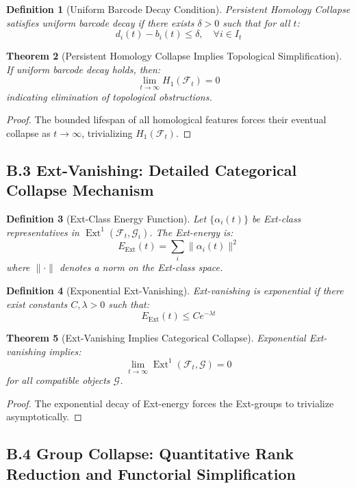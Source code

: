\documentclass[11pt]{article}
\newtheorem{theorem}{Theorem}[section]
\newtheorem{definition}[theorem]{Definition}
\DeclareMathOperator{\Ext}{Ext}
\begin{document}
\begin{definition}[Uniform Barcode Decay Condition]
Persistent Homology Collapse satisfies uniform barcode decay if there exists $\delta > 0$ such that for all $t$:
\[
d_i(t) - b_i(t) \leq \delta, \quad \forall i \in I_t
\]
\end{definition}

\begin{theorem}[Persistent Homology Collapse Implies Topological Simplification]
If uniform barcode decay holds, then:
\[
\lim_{t \to \infty} H_1(\mathcal{F}_t) = 0
\]
indicating elimination of topological obstructions.
\end{theorem}

\begin{proof}
The bounded lifespan of all homological features forces their eventual collapse as $t \to \infty$, trivializing $H_1(\mathcal{F}_t)$.
\end{proof}

\subsection*{B.3 Ext-Vanishing: Detailed Categorical Collapse Mechanism}

\begin{definition}[Ext-Class Energy Function]
Let $\{\alpha_i(t)\}$ be Ext-class representatives in $\Ext^1(\mathcal{F}_t, \mathcal{G}_i)$. The Ext-energy is:
\[
E_{\mathrm{Ext}}(t) = \sum_{i} \| \alpha_i(t) \|^2
\]
where $\|\cdot\|$ denotes a norm on the Ext-class space.
\end{definition}

\begin{definition}[Exponential Ext-Vanishing]
Ext-vanishing is exponential if there exist constants $C, \lambda > 0$ such that:
\[
E_{\mathrm{Ext}}(t) \leq C e^{-\lambda t}
\]
\end{definition}

\begin{theorem}[Ext-Vanishing Implies Categorical Collapse]
Exponential Ext-vanishing implies:
\[
\lim_{t \to \infty} \Ext^1(\mathcal{F}_t, \mathcal{G}) = 0
\]
for all compatible objects $\mathcal{G}$.
\end{theorem}

\begin{proof}
The exponential decay of Ext-energy forces the Ext-groups to trivialize asymptotically.
\end{proof}

\subsection*{B.4 Group Collapse: Quantitative Rank Reduction and Functorial Simplification}
\end{document}
